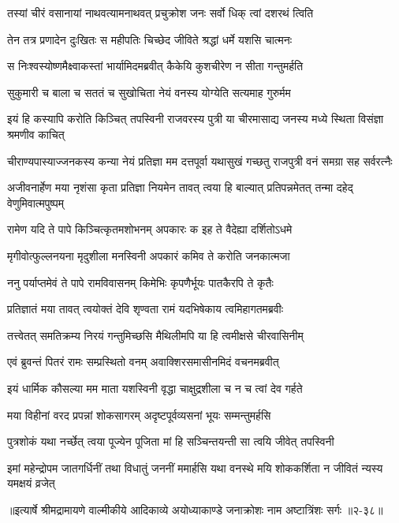 
\twolineshloka
{तस्यां चीरं वसानायां नाथवत्यामनाथवत्}
{प्रचुक्रोश जनः सर्वो धिक् त्वां दशरथं त्विति} %

\twolineshloka
{तेन तत्र प्रणादेन दुःखितः स महीपतिः}
{चिच्छेद जीविते श्रद्धां धर्मे यशसि चात्मनः} %

\twolineshloka
{स निःश्वस्योष्णमैक्ष्वाकस्तां भार्यामिदमब्रवीत्}
{कैकेयि कुशचीरेण न सीता गन्तुमर्हति} %

\twolineshloka
{सुकुमारी च बाला च सततं च सुखोचिता}
{नेयं वनस्य योग्येति सत्यमाह गुरुर्मम} %

\twolineshloka
{इयं हि कस्यापि करोति किञ्चित् तपस्विनी राजवरस्य पुत्री}
{या चीरमासाद्य जनस्य मध्ये स्थिता विसंज्ञा श्रमणीव काचित्} %

\twolineshloka
{चीराण्यपास्याज्जनकस्य कन्या नेयं प्रतिज्ञा मम दत्तपूर्वा}
{यथासुखं गच्छतु राजपुत्री वनं समग्रा सह सर्वरत्नैः} %

\twolineshloka
{अजीवनार्हेण मया नृशंसा कृता प्रतिज्ञा नियमेन तावत्}
{त्वया हि बाल्यात् प्रतिपन्नमेतत् तन्मा दहेद् वेणुमिवात्मपुष्पम्} %

\twolineshloka
{रामेण यदि ते पापे किञ्चित्कृतमशोभनम्}
{अपकारः क इह ते वैदेह्या दर्शितोऽधमे} %

\twolineshloka
{मृगीवोत्फुल्लनयना मृदुशीला मनस्विनी}
{अपकारं कमिव ते करोति जनकात्मजा} %

\twolineshloka
{ननु पर्याप्तमेवं ते पापे रामविवासनम्}
{किमेभिः कृपणैर्भूयः पातकैरपि ते कृतैः} %

\twolineshloka
{प्रतिज्ञातं मया तावत् त्वयोक्तं देवि शृण्वता}
{रामं यदभिषेकाय त्वमिहागतमब्रवीः} %

\twolineshloka
{तत्त्वेतत् समतिक्रम्य निरयं गन्तुमिच्छसि}
{मैथिलीमपि या हि त्वमीक्षसे चीरवासिनीम्} %

\twolineshloka
{एवं ब्रुवन्तं पितरं रामः सम्प्रस्थितो वनम्}
{अवाक्शिरसमासीनमिदं वचनमब्रवीत्} %

\twolineshloka
{इयं धार्मिक कौसल्या मम माता यशस्विनी}
{वृद्धा चाक्षुद्रशीला च न च त्वां देव गर्हते} %

\twolineshloka
{मया विहीनां वरद प्रपन्नां शोकसागरम्}
{अदृष्टपूर्वव्यसनां भूयः सम्मन्तुमर्हसि} %

\twolineshloka
{पुत्रशोकं यथा नर्च्छेत् त्वया पूज्येन पूजिता}
{मां हि सञ्चिन्तयन्ती सा त्वयि जीवेत् तपस्विनी} %

\twolineshloka
{इमां महेन्द्रोपम जातगर्धिनीं तथा विधातुं जननीं ममार्हसि}
{यथा वनस्थे मयि शोककर्शिता न जीवितं न्यस्य यमक्षयं व्रजेत्} %


॥इत्यार्षे श्रीमद्रामायणे वाल्मीकीये आदिकाव्ये अयोध्याकाण्डे जनाक्रोशः नाम अष्टात्रिंशः सर्गः ॥२-३८॥
